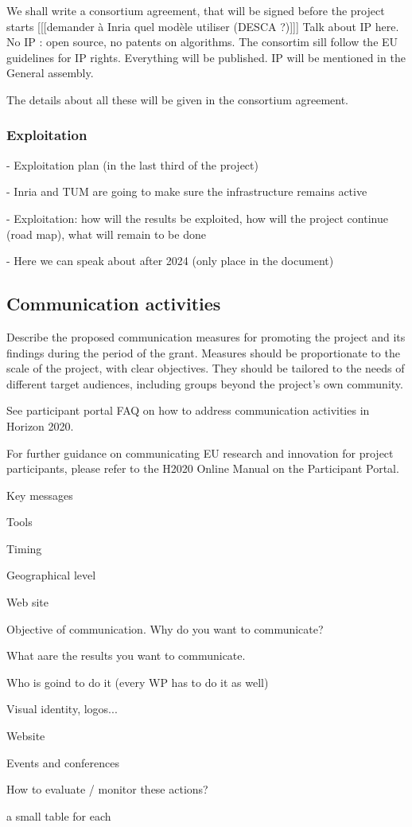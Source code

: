 We shall write a consortium agreement, that will be signed before the
project starts [[[demander à Inria quel modèle utiliser (DESCA ?)]]]
Talk about IP here. No IP : open source, no patents on algorithms.
The consortim sill follow the EU guidelines for IP rights.
Everything will be published. IP will be mentioned in the General assembly.

The details about all these will be given in the consortium agreement.
 
\subsubsection*{Exploitation}

- Exploitation plan (in the last third of the project)

- Inria and TUM are going to make sure the infrastructure remains active


- Exploitation: how will the results be exploited, how will the project
continue (road map), what will remain to be done

- Here we can speak about after 2024 (only place in the document)

\subsection{Communication activities}


\begin{todo}{}\color{red}
  Describe the proposed communication measures for promoting the project and its findings during the period of the grant. Measures should be proportionate to the scale of the project, with clear objectives.  They should be tailored to the needs of different target audiences, including groups beyond the project's own community.

  See participant portal FAQ on how to address communication activities in Horizon 2020.

  For further guidance on communicating EU research and innovation for project participants, please refer to the H2020 Online Manual on the Participant Portal.
\end{todo}

Key messages

Tools

Timing

Geographical level

Web site

Objective of communication. Why do you want to communicate?

What aare the results you want to communicate.

Who is goind to do it (every WP has to do it as well)

Visual identity, logos...

Website

Events and conferences

How to evaluate / monitor these actions?

{\color{red} a small table for each}



